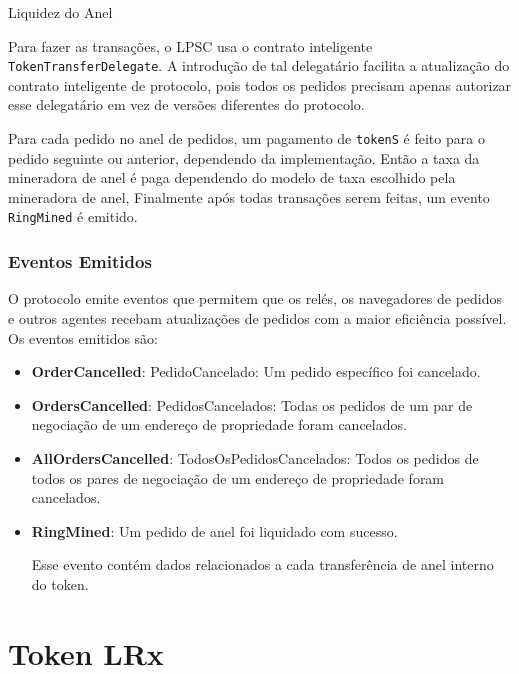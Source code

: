 \documentclass[UTF8,nofonts]{article}
\makeatletter
\newenvironment{figurehere}
 {\def\@captype{figure}}
 {}
\makeatother
\begin{document}
\begin{multicols}{2}
\begin{center}
\begin{figurehere}
\caption{Liquidez do Anel}
\label{fig:settlement}
\end{figurehere}
\end{center}

Para fazer as transações, o LPSC usa o contrato inteligente \verb|TokenTransferDelegate|. A introdução de tal delegatário facilita a atualização do contrato inteligente de protocolo, pois todos os pedidos precisam apenas autorizar esse delegatário em vez de versões diferentes do protocolo.


Para cada pedido no anel de pedidos, um pagamento de \verb|tokenS| é feito para o pedido seguinte ou anterior, dependendo da implementação. Então a taxa da mineradora de anel é paga dependendo do modelo de taxa escolhido pela mineradora de anel, Finalmente após todas transações serem feitas, um evento \verb|RingMined| é emitido.


\subsubsection{Eventos Emitidos\label{sec:events}}

O protocolo emite eventos que permitem que os relés, os navegadores de pedidos e outros agentes recebam atualizações de pedidos com a maior eficiência possível. Os eventos emitidos são:


\begin{itemize}
	\item \textbf{OrderCancelled}: PedidoCancelado: Um pedido específico foi cancelado.
	\item \textbf{OrdersCancelled}: PedidosCancelados: Todas os pedidos de um par de negociação de um endereço de propriedade foram cancelados.
	\item \textbf{AllOrdersCancelled}: TodosOsPedidosCancelados: Todos os pedidos de todos os pares de negociação de um endereço de propriedade foram cancelados.
	\item \textbf{RingMined}: Um pedido de anel foi liquidado com sucesso.
	
	Esse evento contém dados relacionados a cada transferência de anel interno do token.
\end{itemize}



\section{Token LRx\label{sec:token}}


\end{multicols}
\end{document}

